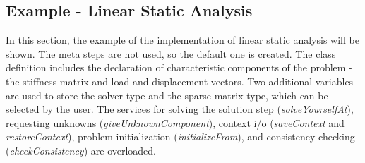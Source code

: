 \documentclass[a4paper]{article}
\newcommand{\service}[1]{{\em #1}}
\begin{document}
\subsection{Example - Linear Static Analysis}
\label{Engngmodelexample}
In this section, the example of the implementation of linear static
analysis will be shown. The meta steps are not used, so the default
one is created. 
The class definition includes the declaration of characteristic
components of the problem - the stiffness matrix and load and
displacement vectors. Two additional variables are used to store the
solver type and the sparse matrix type, which can be selected by the user.
The services for solving the solution step (\service{solveYourselfAt}), 
requesting unknowns (\service{giveUnknownComponent}), context i/o
(\service{saveContext} and \service{restoreContext}), problem
initialization (\service{initializeFrom}), and  consistency checking
(\service{checkConsistency}) are overloaded.
\end{document}
